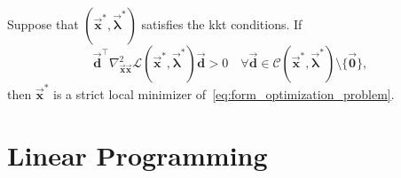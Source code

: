\documentclass[9pt, headings=standardclasses, parskip=half]{scrartcl}
\renewcommand{\emph}[1]{\textcolor{mypurple}{#1}}
\newcommand{\matr}[1]{\underline{\boldsymbol{#1}}}
\newcommand{\vect}[1]{\vec{\boldsymbol{#1}}}
\newcommand{\R}{\mathbb{R}}
\begin{document}
\begin{theorem}\label{thm:SOSC}
  Suppose that \( (\vect{x}^{\ast},\vect{\lambda}^{\ast}) \) satisfies the \gls{kkt} conditions. If
  \[
    \vect{d}^{\top} \nabla^{2}_{\vect{x}\vect{x}} \mathcal{L}(\vect{x}^{\ast},\vect{\lambda}^{\ast}) \vect{d} > 0 \quad \forall \vect{d}\in\mathcal{C}(\vect{x}^{\ast},\vect{\lambda}^{\ast}) \setminus \{ \vect{0} \},
  \]
  then \( \vect{x}^{\ast} \) is a strict local minimizer of~\eqref{eq:form_optimization_problem}.
\end{theorem}


















\section{Linear Programming}\label{sec:linear_programming}









\end{document}
